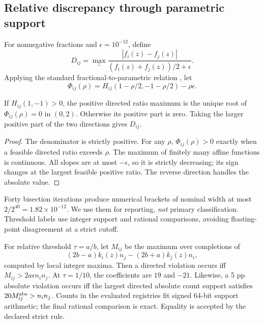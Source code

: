 \subsection{Relative discrepancy through parametric support}
For nonnegative fractions and $\epsilon=10^{-12}$, define
\begin{equation}
 D_{ij}=\max_z\frac{|f_i(z)-f_j(z)|}{(f_i(z)+f_j(z))/2+\epsilon}.
\label{eq:relative}
\end{equation}
Applying the standard fractional-to-parametric relation \cite{dinkelbach}, let
\begin{equation}
 \Phi_{ij}(\rho)=H_{ij}(1-\rho/2,-1-\rho/2)-\rho\epsilon.
\label{eq:phi}
\end{equation}
\begin{proposition}
If $H_{ij}(1,-1)>0$, the positive directed ratio maximum is the unique root of $\Phi_{ij}(\rho)=0$ in $(0,2)$. Otherwise its positive part is zero. Taking the larger positive part of the two directions gives $D_{ij}$.
\end{proposition}
\begin{proof}
The denominator is strictly positive. For any $\rho$, $\Phi_{ij}(\rho)>0$ exactly when a feasible directed ratio exceeds $\rho$. The maximum of finitely many affine functions is continuous. All slopes are at most $-\epsilon$, so it is strictly decreasing; its sign changes at the largest feasible positive ratio. The reverse direction handles the absolute value.
\end{proof}
Forty bisection iterations produce numerical brackets of nominal width at most $2/2^{40}=1.82\times10^{-12}$. We use them for reporting, \emph{not} primary classification. Threshold labels use integer support and rational comparisons, avoiding floating-point disagreement at a strict cutoff.

For relative threshold $\tau=a/b$, let $M_{ij}$ be the maximum over completions of
\begin{equation}
 (2b-a)k_i(z)n_j-(2b+a)k_j(z)n_i,
\label{eq:integer}
\end{equation}
computed by local integer maxima. Then a directed violation occurs iff $M_{ij}>2a\epsilon n_i n_j$. At $\tau=1/10$, the coefficients are $19$ and $-21$. Likewise, a 5 pp absolute violation occurs iff the largest directed absolute count support satisfies $20M_{ij}^{\rm abs}>n_i n_j$. Counts in the evaluated registries fit signed 64-bit support arithmetic; the final rational comparison is exact. Equality is accepted by the declared strict rule.

